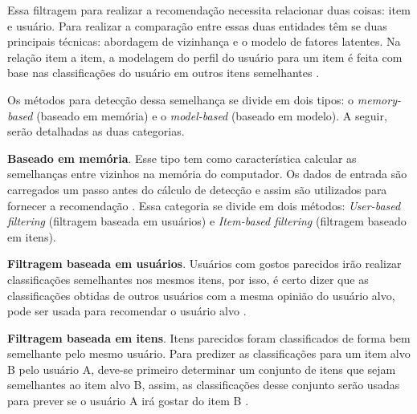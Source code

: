 Essa filtragem para realizar a recomendação necessita relacionar duas coisas: item e usuário. Para realizar a comparação entre essas duas entidades têm se duas principais técnicas: abordagem de vizinhança e o modelo de fatores latentes. Na relação item a item, a modelagem do perfil do usuário para um item é feita com base nas classificações do usuário em outros itens semelhantes \cite{Koren:2015}.

Os métodos para detecção dessa semelhança se divide em dois tipos: o \textit{memory-based} (baseado em memória) e o \textit{model-based} (baseado em modelo). A seguir, serão detalhadas as duas categorias.


\textbf{Baseado em memória}. Esse tipo tem como característica calcular as semelhanças entre vizinhos na memória do computador. Os dados de entrada são carregados um passo antes do cálculo de detecção e assim são utilizados para fornecer a recomendação \cite{Levinas2014AnAO}. Essa categoria se divide em dois métodos: \textit{User-based filtering} (filtragem baseada em usuários) e \textit{Item-based filtering} (filtragem baseado em itens).


\textbf{Filtragem baseada em usuários}. Usuários com gostos parecidos irão realizar classificações semelhantes nos mesmos itens, por isso, é certo dizer que as classificações obtidas de outros usuários com a mesma opinião do usuário alvo, pode ser usada para recomendar o usuário alvo \cite{Cimini:2019}.


\textbf{Filtragem baseada em itens}. Itens parecidos foram classificados de forma bem semelhante pelo mesmo usuário. Para predizer as classificações para um item alvo B pelo usuário A, deve-se primeiro determinar um conjunto de itens que sejam semelhantes ao item alvo B, assim, as classificações desse conjunto serão usadas para prever se o usuário A irá gostar do item B \cite{Cimini:2019}.

